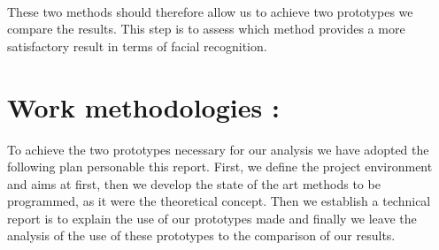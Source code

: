 \paragraph{}
These two methods should therefore allow us to achieve two prototypes we compare the results. This step is to assess which method provides a more satisfactory result in terms of facial recognition.
\section{Work methodologies :}
To achieve the two prototypes necessary for our analysis we have adopted the following plan personable this report. First, we define the project environment and aims at first, then we develop the state of the art methods to be programmed, as it were the theoretical concept. Then we establish a technical report is to explain the use of our prototypes made and finally we leave the analysis of the use of these prototypes to the comparison of our results.

